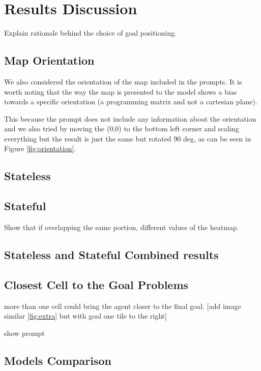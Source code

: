\chapter{Results Discussion}
\label{cha:results_discussion}

Explain rationale behind the choice of goal positioning.

\section{Map Orientation}

We also considered the orientation of the map included in the prompts. It is
worth noting that the way the map is presented to the model shows a bias towards
a specific orientation (a programming matrix and not a cartesian plane).

This because the prompt does not include any information about the orientation
and we also tried by moving the (0,0) to the bottom left corner and scaling
everything but the result is just the same but rotated 90 deg, as can be seen in
Figure \ref{fig:orientation}.

\section{Stateless}
\label{sec:stateless}

\section{Stateful}
\label{sec:stateful}

Show that if overlapping the same portion, different values of the heatmap.

\section{Stateless and Stateful Combined results}
\label{sec:stateless_and_stateful_combined_results}

\section{Closest Cell to the Goal Problems}
\label{sec:closest_cell_to_the_goal_problems} more than one cell could bring the
agent closer to the final goal. [add image similar \ref{fig:extra} but with goal
one tile to the right]

show prompt

\section{Models Comparison}
\label{sec:models_comparison}